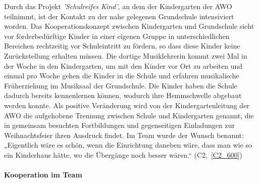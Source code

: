 Durch das Projekt \emph{'Schulreifes Kind'}, an dem der Kindergarten der AWO teilnimmt, ist der Kontakt zu der nahe gelegenen Grundschule intensiviert worden. 
Das Kooperationskonzept zwischen Kindergarten und Grundschule sieht vor förderbedürftige Kinder in einer eigenen Gruppe in unterschiedlichen Bereichen rechtzeitig vor Schuleintritt zu fördern, so dass diese Kinder keine Zurückstellung erhalten müssen.  
Die dortige Musiklehrerin kommt zwei Mal in der Woche in den Kindergarten, um mit den Kinder vor Ort zu arbeiten und einmal pro Woche gehen die Kinder in die Schule und erfahren musikalische Früherziehung im Musiksaal der Grundschule. Die Kinder haben die Schule dadurch bereits kennenlernen können, wodurch ihre Hemmschwelle abgebaut werden konnte.  
Als positive Veränderung wird von der Kindergartenleitung der AWO die aufgehobene Trennung zwischen Schule und Kindergarten genannt, die in gemeinsam besuchten Fortbildungen und gegenseitigen Einladungen zur Weihnachtsfeier ihren Ausdruck findet. Im Team wurde der Wunsch benannt: „Eigentlich wäre es schön, wenn die Einrichtung daneben wäre, dass man wie so ein Kinderhaus hätte, wo die Übergänge noch besser wären.“ (C2,~\ref{C2_600}) 

\paragraph{Kooperation im Team}

